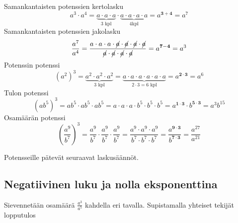     Samankantaisten potenssien kertolasku
	\[
a^3\cdot a^4=\underbrace{a\cdot a\cdot a}_{\text{3 kpl}}\cdot \underbrace{a\cdot a\cdot a\cdot a}_{\text{4kpl}}=a^{\mathbf{3+4}}=a^7
    	\]
    Samankantaisten potenssien jakolasku
	\[
\frac{a^7}{a^4}=\frac{a\cdot a\cdot a\cdot \cancel{a}\cdot \cancel{a}\cdot \cancel{a}\cdot \cancel{a}}	{\cancel{a}\cdot \cancel{a}\cdot \cancel{a}\cdot \cancel{a}}=a^{\mathbf{7-4}}=a^3
    	\]
    Potenssin potenssi
	\[
(a^2)^3=\underbrace{a^2\cdot a^2\cdot a^2}_{3\text{ kpl}}=\underbrace{a\cdot a\cdot a\cdot a\cdot a\cdot a}_{2\cdot 3=6\text{ kpl}}=a^{\boldsymbol{{2\cdot 3}}}=a^6
\]
    Tulon potenssi
	\[
(ab^5)^3=ab^5\cdot ab^5\cdot ab^5=a\cdot a\cdot a\cdot b^5\cdot b^5\cdot b^5=a^{\mathbf{1\cdot 3}}\cdot b^{\mathbf{5\cdot 3}}=a^3b^{15}
	\]
     Osamäärän potenssi
	\[
	\left(\frac{a^9}{b^7}\right)^3=\frac{a^9}{b^7}\cdot \frac{a^9}{b^7}\cdot \frac{a^9}{b^7}=\frac{a^9\cdot a^9\cdot a^9}{b^7\cdot b^7\cdot b^7}=\frac{a^{\mathbf{9\cdot 3}}}{b^{\mathbf{7\cdot 3}}}=\frac{a^{27}}{a^{21}}
	\]

    Potensseille pätevät seuraavat laskusäännöt.
    
    
\subsection*{Negatiivinen luku ja nolla eksponenttina}
    
    Sievennetään osamäärä $\frac{a^3}{a^5}$ kahdella eri tavalla. Supistamalla yhteiset tekijät lopputulos
    

